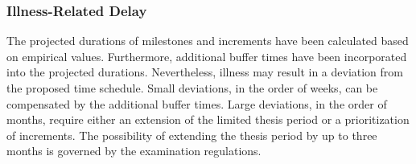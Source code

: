 \subsubsection{Illness-Related Delay}
The projected durations of milestones and increments have been calculated based on empirical values.
Furthermore, additional buffer times have been incorporated into the projected durations.
Nevertheless, illness may result in a deviation from the proposed time schedule.
Small deviations, in the order of weeks, can be compensated by the additional buffer times.
Large deviations, in the order of months, require either an extension of the limited thesis period or a prioritization of increments.
The possibility of extending the thesis period by up to three months is governed by the examination regulations.

